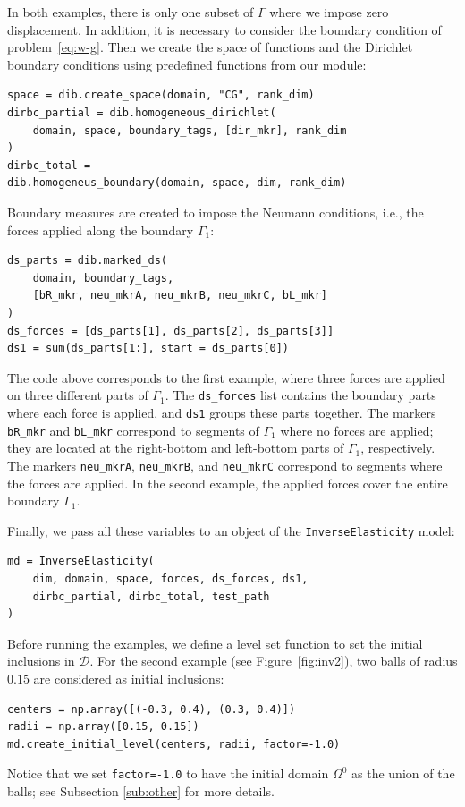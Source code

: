 \documentclass[iicol,pdflatex,sn-mathphys-ay]{sn-jnl}%
\theoremstyle{thmstyleone}%
\theoremstyle{thmstyletwo}%
\theoremstyle{thmstylethree}%
\begin{document}
In both examples, there is only one subset of $\Gamma$ where
we impose zero displacement. In addition, it is necessary to consider the 
boundary condition of problem~\eqref{eq:w-g}.  
Then we create the space of functions and the Dirichlet boundary conditions
using predefined functions from our module:
\begin{lstlisting}
space = dib.create_space(domain, "CG", rank_dim)
dirbc_partial = dib.homogeneous_dirichlet(
	domain, space, boundary_tags, [dir_mkr], rank_dim
)
dirbc_total =
dib.homogeneus_boundary(domain, space, dim, rank_dim)
\end{lstlisting}

Boundary measures are created to impose the Neumann conditions, i.e.,
the forces applied along the boundary $\Gamma_1$:
\begin{lstlisting}
ds_parts = dib.marked_ds(
	domain, boundary_tags,
	[bR_mkr, neu_mkrA, neu_mkrB, neu_mkrC, bL_mkr]
)
ds_forces = [ds_parts[1], ds_parts[2], ds_parts[3]] 
ds1 = sum(ds_parts[1:], start = ds_parts[0])
\end{lstlisting}
The code above corresponds to the first example, where three forces are applied
on three different parts of $\Gamma_1$.
The \texttt{ds\_forces} list contains the boundary parts where each force is applied, 
and \texttt{ds1} groups these parts together.
The markers \texttt{bR\_mkr} and \texttt{bL\_mkr} correspond to segments of $\Gamma_1$ where
no forces are applied;
they are located at the right-bottom and left-bottom parts of $\Gamma_1$, respectively. 
The markers \texttt{neu\_mkrA}, \texttt{neu\_mkrB}, and \texttt{neu\_mkrC}
correspond to segments where the forces are applied.
In the second example, the applied forces cover the entire boundary $\Gamma_1$.

Finally, we pass all these variables to an object of the \texttt{InverseElasticity} model:
\begin{lstlisting}
md = InverseElasticity(
	dim, domain, space, forces, ds_forces, ds1,
	dirbc_partial, dirbc_total, test_path
)
\end{lstlisting}
Before running the examples, we define a level set function to set
the initial inclusions in $\mathcal{D}$.
For the second example (see Figure~\ref{fig:inv2}),
two balls of radius $0.15$ are considered as initial inclusions:
\begin{lstlisting}
centers = np.array([(-0.3, 0.4), (0.3, 0.4)])
radii = np.array([0.15, 0.15])
md.create_initial_level(centers, radii, factor=-1.0)
\end{lstlisting}
Notice that we set \texttt{factor=-1.0} to have the initial domain $\Omega^0$
as the union of the balls; see Subsection \ref{sub:other} for more details.
\end{document}
